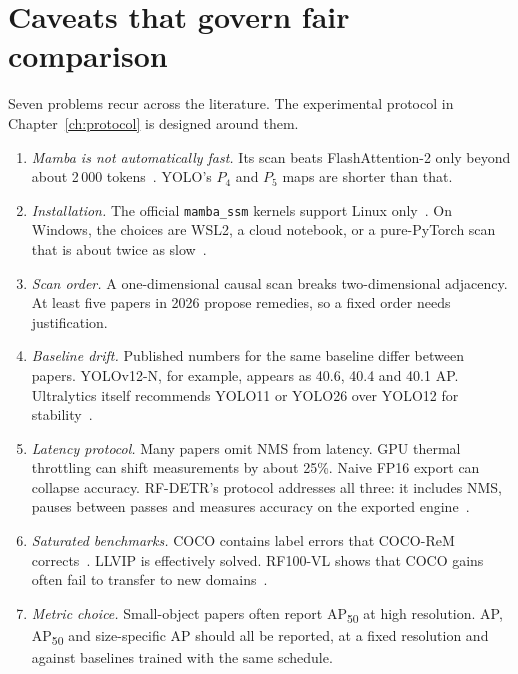 \section{Caveats that govern fair comparison}
\label{sec:caveats}

Seven problems recur across the literature. The experimental protocol in
Chapter~\ref{ch:protocol} is designed around them.

\begin{enumerate}
  \item \emph{Mamba is not automatically fast.} Its scan beats
        FlashAttention-2 only beyond about 2\,000 tokens~\citep{gu2023mamba,dao2023flash2}.
        YOLO's $P_4$ and $P_5$ maps are shorter than that.
  \item \emph{Installation.} The official \texttt{mamba\_ssm} kernels
        support Linux only~\citep{mambassm_repo}. On Windows, the choices are
        WSL2, a cloud notebook, or a pure-PyTorch scan that is about twice
        as slow~\citep{mambapy_repo}.
  \item \emph{Scan order.} A one-dimensional causal scan breaks
        two-dimensional adjacency. At least five papers in 2026 propose
        remedies, so a fixed order needs justification.
  \item \emph{Baseline drift.} Published numbers for the same baseline differ
        between papers. YOLOv12-N, for example, appears as 40.6, 40.4 and
        40.1 AP. Ultralytics itself recommends YOLO11 or YOLO26 over YOLO12
        for stability~\citep{yolo26_2026}.
  \item \emph{Latency protocol.} Many papers omit NMS from latency. GPU
        thermal throttling can shift measurements by about 25\%. Naive FP16
        export can collapse accuracy. RF-DETR's protocol addresses all three:
        it includes NMS, pauses between passes and measures accuracy on the
        exported engine~\citep{robinson2025rfdetr}.
  \item \emph{Saturated benchmarks.} COCO contains label errors that
        COCO-ReM corrects~\citep{singh2024cocorem}. LLVIP is effectively
        solved. RF100-VL shows that COCO gains often fail to transfer to new
        domains~\citep{robicheaux2025rf100vl}.
  \item \emph{Metric choice.} Small-object papers often report
        AP\textsubscript{50} at high resolution. AP, AP\textsubscript{50} and
        size-specific AP should all be reported, at a fixed resolution and
        against baselines trained with the same schedule.
\end{enumerate}

